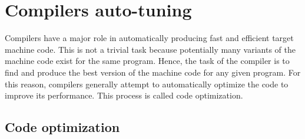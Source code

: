 \begin{itemize}
	
\end{itemize}






\section{Compilers auto-tuning}
\label{bg:Compilers auto-tuning}

Compilers have a major role in automatically producing fast and efficient target machine code. This is not a trivial task because potentially many variants of the machine code exist for the same program. Hence, the task of the compiler is to find and produce the best version of the machine code for any given program. For this reason, compilers generally attempt to automatically optimize the code to improve its performance.
This process is called code optimization. 

\subsection{Code optimization}

